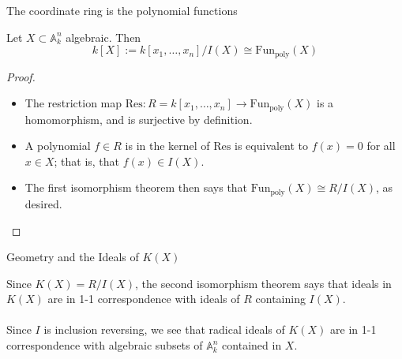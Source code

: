 \documentclass{beamer}
\newcommand{\AAA}{\mathbb{A}}
\begin{document}
\begin{frame}{The coordinate ring is the polynomial functions}

\begin{lemma}
Let $X\subset \AAA_k^n$ algebraic.  Then 
$$k[X]:=k[x_1,\dots, x_n]/I(X)\cong \text{Fun}_{\text{poly}}(X)$$
\end{lemma}

\begin{proof}
\begin{itemize}
\item The restriction map $\textrm{Res}:R=k[x_1,\dots, x_n]\to \textrm{Fun}_{\textrm{poly}}(X)$ is a homomorphism, and is surjective by definition.
\item A polynomial $f\in R$ is in the kernel of $\textrm{Res}$ is equivalent to $f(x)=0$ for all $x\in X$; that is, that $f(x)\in I(X)$.
\item The first isomorphism theorem then says that $\textrm{Fun}_{\textrm{poly}}(X)\cong R/I(X)$, as desired.
\end{itemize}
\end{proof}

\end{frame}


\begin{frame}{Geometry and the Ideals of $K(X)$}

Since $K(X)=R/I(X)$, the second isomorphism theorem says that ideals in $K(X)$ are in 1-1 correspondence with ideals of $R$ containing $I(X)$. \\~\\

Since $I$ is inclusion reversing, we see that radical ideals of $K(X)$ are in 1-1 correspondence with algebraic subsets of $\AAA_k^n$ contained in $X$. \\~\\

\begin{center}
\end{center}


\end{frame}
\end{document}
